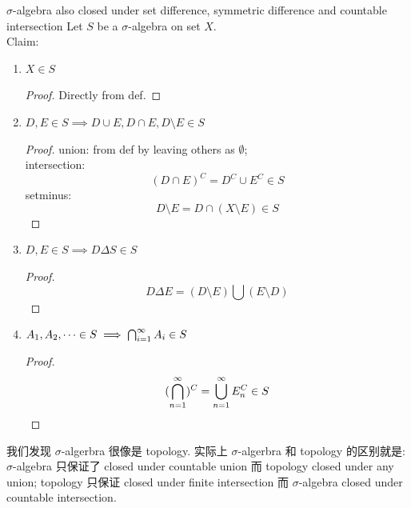 \begin{theorem}{$\sigma$-algebra also closed under set difference, symmetric difference and countable intersection}
    Let $S$ be a $\sigma$-algebra on set $X$.\\
    Claim: 
    \begin{enumerate}
        \item $X \in S$
        \begin{proof}
            Directly from def.
        \end{proof}
        \item $D,E \in S \implies D\cup E, D\cap E, D \setminus E \in S$
        \begin{proof}
            union: from def by leaving others as $\emptyset$; \\intersection: $$(D\cap E)^C = D^C \cup E^C \in S$$
            setminus: $$ D\setminus E = D \cap (X \setminus E) \in S$$    
        \end{proof}
        \item $D,E \in S \implies D \Delta S\in S$
        \begin{proof}
        $$
        D \Delta E = (D \setminus E) \bigcup (E \setminus D)
        $$
        \end{proof}
        \item $A_1,A_2,\cdots \in S \implies \bigcap_{i=1}^\infty A_i \in S$
        \begin{proof}
            $$(\bigcap_{n=1}^\infty )^C = \bigcup_{n=1}^\infty E_n ^C \in S  $$
        \end{proof}
    \end{enumerate}
\end{theorem}

\begin{remark}
    我们发现 $\sigma$-algerbra 很像是 topology. 实际上 $\sigma$-algerbra 和 topology 的区别就是: $\sigma$-algebra 只保证了 closed under countable union 而 topology closed under any union; topology 只保证 closed under finite intersection 而 $\sigma$-algebra closed under countable intersection.
\end{remark}


